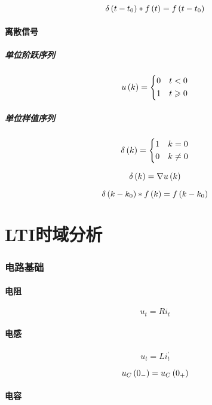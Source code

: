 \documentclass{article}
\begin{document}
\[\delta\left(t-t_0\right)\ast f\left(t\right)=f\left(t-t_0\right)\]

\subsection{离散信号}

\subsubsection{单位阶跃序列}

\[u\left(k\right)=
    \left\{\begin{aligned}
        0 &  & t<0         \\
        1 &  & t\geqslant0
    \end{aligned}\right.\]


\subsubsection{单位样值序列}

\[\delta\left(k\right)=
    \left\{\begin{aligned}
        1 &  & k=0    \\
        0 &  & k\neq0
    \end{aligned}\right.\]

\[\delta\left(k\right)=\nabla u\left(k\right)\]

\[\delta\left(k-k_0\right)\ast f\left(k\right)=f\left(k-k_0\right)\]

\part{LTI时域分析}

\section{电路基础}

\subsection{电阻}

\[u_t=Ri_t\]

\subsection{电感}

\[u_t=Li_t^\prime\]

\[u_C\left(0_-\right)=u_C\left(0_+\right)\]

\subsection{电容}
\end{document}
